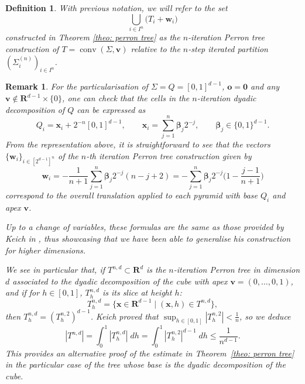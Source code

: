 \documentclass[10pt]{amsart}
\newcommand{\R}{\mathbf{R}}
\newcommand{\conv}{\operatorname{conv}}
\newtheorem{definition}[theorem]{Definition}
\newtheorem{remark}[theorem]{Remark}
\begin{document}
\begin{definition}
With previous notation, we will refer to the set
\begin{equation*}
    \bigcup_{i\in I^n}\Big( T_i+\mathbf{w}_i\Big)
\end{equation*}
constructed in Theorem \ref{theo: perron tree} as the $n$-iteration Perron tree construction of $T=\conv(\Sigma, \mathbf{v})$ relative to the $n$-step iterated partition $(\Sigma_i^{(n)})_{i \in I^n}$.
\end{definition}
\begin{remark}For the particularisation of $\Sigma=Q=[0,1]^{d-1}$, $\mathbf{o}=\mathbf{0}$ and any $\mathbf{v}\notin \R^{d-1}\times\{0\}$, one can check that the cells in the $n$-iteration dyadic decomposition of $Q$ can be expressed as
\begin{equation*}
    Q_i=\mathbf{x}_i+2^{-n}[0,1]^{d-1},\qquad \mathbf{x}_i=\sum_{j=1}^n\boldsymbol{\beta}_j2^{-j},\qquad \boldsymbol\beta_j\in \{0,1\}^{d-1}.
\end{equation*}
From the representation above, it is straightforward to see that the vectors $\{\mathbf{w}_i\}_{i\in [2^{d-1}]^n}$ of the $n$-th iteration Perron tree construction given by
\begin{equation*}
    \mathbf{w}_i=-\frac{1}{n+1}\sum_{j=1}^n\boldsymbol{\beta}_j2^{-j}(n-j+2)=-\sum_{j=1}^n\boldsymbol\beta_j2^{-j}\Big(1-\frac{j-1}{n+1}\Big)
\end{equation*}
correspond to the overall translation applied to each pyramid with base $Q_i$ and apex  $\mathbf{v}$.

Up to a change of variables, these formulas are the same as those provided by Keich in \cite{RefWorks:keich1999lp}, thus showcasing that we have been able to generalise his construction for higher dimensions. 

We see in particular that, if $T^{n,d}\subset \R^d$ is the $n$-iteration Perron tree in dimension $d$ associated to the dyadic decomposition of the cube with apex $\mathbf{v}=(0,\dots,0,1)$, and if for $h\in [0,1]$, $T^{n,d}_h$ is its slice at height $h$:
\[ T^{n,d}_h=\{\mathbf{x}\in \R^{d-1}\mid(\mathbf{x},h)\in T^{n,d}\},\]
then $T^{n,d}_h=(T^{n,2}_h)^{d-1}$. Keich proved that $\sup_{h\in [0,1]}|T_h^{n,2}|< \frac{1}{n}$, so we deduce 
\[|T^{n,d}|=\int_0^1 |T^{n,d}_h|\;dh=\int_0^1 |T^{n,2}_h|^{d-1}\;dh\leq \frac{1}{n^{d-1}}.\]
This provides an alternative proof of the estimate in Theorem~\ref{theo: perron tree} in the particular case of the tree whose base is the dyadic decomposition of the cube.
\end{remark}
\end{document}
